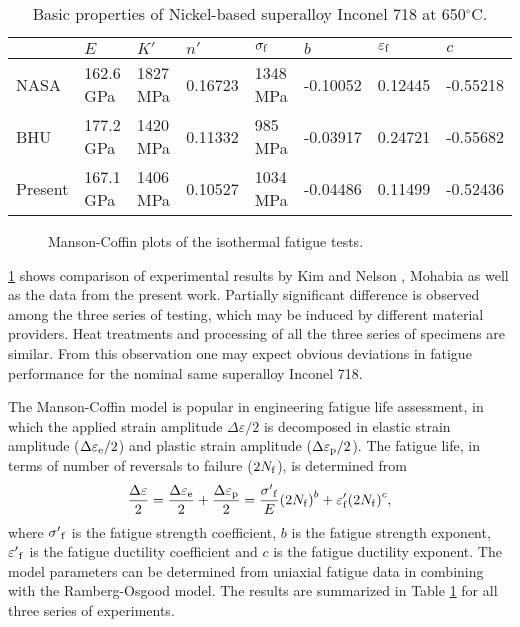 \begin{table}[htbp]
  \centering
  \caption{Basic properties of Nickel-based superalloy Inconel 718 at 650$^{\circ}$C.}
    \begin{tabular}{llllllll}
    \hline
          & $E$     & $K'$     & $n'$     & $\sigma_{\rm f}$    & $b$     & $\varepsilon_{\rm f}$    & $c$ \\
    \hline
    NASA \cite{kim1988elevated, nelson1992creep}  & 162.6 GPa & 1827 MPa  & 0.16723 & 1348 MPa & -0.10052 & 0.12445 & -0.55218 \\
    BHU \cite{Mahobia2014}   & 177.2 GPa & 1420 MPa  & 0.11332 & 985 MPa & -0.03917 & 0.24721 & -0.55682 \\
    Present   & 167.1 GPa & 1406 MPa  & 0.10527 & 1034 MPa & -0.04486 & 0.11499 & -0.52436 \\
    \hline
    \end{tabular}
  \label{tab:MechanicalProperties}
\end{table}

\begin{figure}[!htp]
\caption{Manson-Coffin plots of the isothermal fatigue tests.}
\label{Fig:Baseline}
\end{figure}

\ref{Fig:Baseline} shows  comparison of experimental results by Kim \cite{kim1988elevated} and Nelson \cite{nelson1992creep}, Mohabia \cite{Mahobia2014} as well as the data from the present work. Partially significant difference is observed among the three series of testing, which may be induced by different material providers. Heat treatments and processing of all the three series of specimens are similar. From this observation one may expect obvious deviations in fatigue performance for the nominal same superalloy Inconel 718. 

The Manson-Coffin model is popular in engineering fatigue life assessment, in which the applied strain amplitude $\Delta \varepsilon/2$ is decomposed in elastic strain amplitude ($\Delta \varepsilon_{\rm e}/2$) and plastic strain amplitude ($\Delta \varepsilon_{\rm p}/2$). The fatigue life, in terms of number of reversals to failure ($2N_{\rm f}$), is determined from
\begin{equation}
\frac{{\Delta \varepsilon }}{2} = \frac{{\Delta {\varepsilon _{\rm e}}}}{2} + \frac{{\Delta {\varepsilon _{\rm p}}}}{2} = \frac{{{{\sigma '}_{\rm f}}}}{E}{\left( {2{N_{\rm f}}} \right)^b} + {\varepsilon '_{\rm f}}{\left( {2{N_{\rm f}}} \right)^c},
\label{Equ:CoffinManson}
\end{equation}
where ${{{\sigma '}_{\rm f}}}$ is the fatigue strength coefficient, $b$ is the fatigue strength exponent, ${{{\varepsilon '}_{\rm f}}}$ is the fatigue ductility coefficient and $c$ is the fatigue ductility exponent. The model parameters can be determined from uniaxial fatigue data in combining with the Ramberg-Osgood model. The results are summarized in Table \ref{tab:MechanicalProperties} for all three series of experiments.

